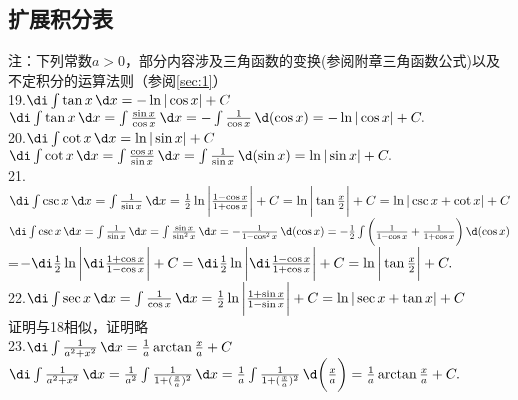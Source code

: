 \subsection{扩展积分表}
\vspace{1em}
\noindent 注：下列常数$a>0$，部分内容涉及三角函数的变换(参阅附章三角函数公式)以及不定积分的运算法则（参阅\ref{sec:1}）\vspace{-0.5em}\\
19.\enspace $\di\int \tan x \,\d x=-\ln |\cos x|+C$
\vspace{1em}\\ \proof $\di\int \tan x \,\d x=\int \frac{\sin x}{\cos x} \,\d x=-\int\frac{1}{\cos x} \,\d (\cos x)=-\ln|\cos x|+C.$\\
20.\enspace $\di\int \cot x \,\d x=\ln |\sin x|+C$
\vspace{1em}\\ \proof $\di\int \cot x \,\d x=\int \frac{\cos x}{\sin x} \,\d x=\int\frac{1}{\sin x} \,\d (\sin x)=\ln|\sin x|+C.$\vspace{0.5em}\\
21.\enspace $\di\int \csc x \,\d x=\int\frac{1}{\sin x} \,\d x=\frac{1}{2}\ln \bigg|\frac{1-\cos x}{1+\cos x}\bigg|+C=\ln\bigg |\tan \frac{x}{2}\bigg|+C=\ln|\csc x+\cot x|+C
$
\vspace{1em}\\ \proof $\di\int \csc x \,\d x=\int \frac{1}{\sin x} \,\d x=\int\frac{\sin x}{\sin^2 x} \,\d x=-\frac{1}{1-\cos^2 x} \,\d (\cos x)=-\frac{1}{2}\int \bigg(\frac{1}{1-\cos x}+\frac{1}{1+\cos x}\bigg) \,\d(\cos x)$\vspace{0.5em}\\
\hspace*{9.5em}=$-\di\frac{1}{2}\ln \bigg|\di\frac{1+\cos x}{1-\cos x}\bigg|+C=\di\frac{1}{2}\ln \bigg|\di\frac{1-\cos x}{1+\cos x}\bigg|+C=\ln\bigg|\tan \frac{x}{2}\bigg|+C. $
\vspace{1em}\\
22.\enspace $\di\int \sec x \,\d x=\int\frac{1}{\cos x} \,\d x=\frac{1}{2}\ln \bigg|\frac{1+\sin x}{1-\sin x}\bigg|+C=\ln|\sec x+\tan x|+C
$
\vspace{1em}\\
\proof 证明与18相似，证明略\vspace{0.5em}\\
23.\enspace $\di\int\frac{1}{a^2+x^2} \,\d x=\frac{1}{a}\arctan\frac{x}{a}+C$\vspace{1.5em}\\
\proof $\di\int\frac{1}{a^2+x^2} \,\d x=\frac{1}{a^2}\int\frac{1}{1+(\frac{x}{a})^2} \,\d x=\frac{1}{a}\int\frac{1}{1+(\frac{x}{a})^2}\,\d\bigg(\frac{x}{a}\bigg)=\frac{1}{a}\arctan\frac{x}{a}+C.$
